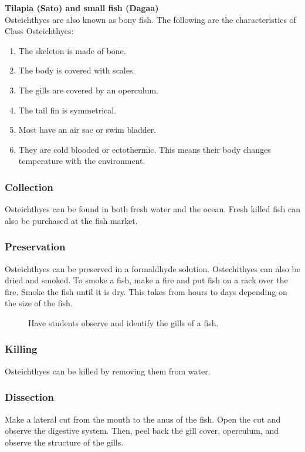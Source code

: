 \textbf{Tilapia (Sato) and small fish (Dagaa)}\\
Osteichthyes are also known as bony fish. The following are the characteristics of Class Osteichthyes:
\begin{enumerate}
\item{The skeleton is made of bone.}
\item{The body is covered with scales.}
\item{The gills are covered by an operculum.}
\item{The tail fin is symmetrical.}
\item{Most have an air sac or swim bladder.}
\item{They are cold blooded or ectothermic. This means their body changes temperature with the environment.}
\end{enumerate}

\subsubsection{Collection}
 Osteichthyes can be found in both fresh water and the ocean. Fresh killed fish can also be purchased at the fish market.

\subsubsection{Preservation} 
Osteichthyes can be preserved in a formaldhyde solution. Ostechithyes can also be dried and smoked. 
To smoke a fish, make a fire and put fish on a rack over the fire. Smoke the fish until it is dry. This takes from hours to days depending on the size of the fish.
\begin{figure}[h]
\begin{center}
\def\svgwidth{6.5cm}

\caption{Have students observe and identify the gills of a fish.}
\label{fig:fish  gills}
\end{center}
\end{figure}

\subsubsection{Killing}
Osteichthyes can be killed by removing them from water. 

\subsubsection{Dissection}
Make a lateral cut from the mouth to the anus of the fish. Open the cut and observe the digestive system. Then, peel back the gill cover, operculum, and observe the structure of the gills.

